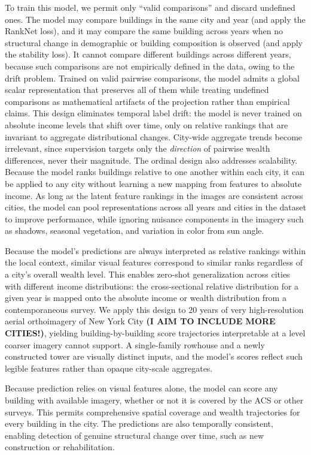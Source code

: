 \documentclass[conference]{IEEEtran}
\begin{document}
To train this model, we permit only ``valid comparisons'' and discard undefined ones. The model may compare buildings in the same city and year (and apply the RankNet loss), and it may compare the same building across years when no structural change in demographic or building composition is observed (and apply the stability loss). It cannot compare different buildings across different years, because such comparisons are not empirically defined in the data, owing to the drift problem. Trained on valid pairwise comparisons, the model admits a global scalar representation that preserves all of them while treating undefined comparisons as mathematical artifacts of the projection rather than empirical claims. This design eliminates temporal label drift: the model is never trained on absolute income levels that shift over time, only on relative rankings that are invariant to aggregate distributional changes. City-wide aggregate trends become irrelevant, since supervision targets only the \emph{direction} of pairwise wealth differences, never their magnitude. The ordinal design also addresses scalability. Because the model ranks buildings relative to one another within each city, it can be applied to any city without learning a new mapping from features to absolute income. As long as the latent feature rankings in the images are consistent across cities, the model can pool representations across all years and cities in the dataset to improve performance, while ignoring nuisance components in the imagery such as shadows, seasonal vegetation, and variation in color from sun angle.

Because the model's predictions are always interpreted as relative rankings within the local context, similar visual features correspond to similar ranks regardless of a city's overall wealth level. This enables zero-shot generalization across cities with different income distributions: the cross-sectional relative distribution for a given year is mapped onto the absolute income or wealth distribution from a contemporaneous survey. We apply this design to 20 years of very high-resolution aerial orthoimagery of New York City \textbf{(I AIM TO INCLUDE MORE CITIES!)}, yielding building-by-building score trajectories interpretable at a level coarser imagery cannot support. A single-family rowhouse and a newly constructed tower are visually distinct inputs, and the model's scores reflect such legible features rather than opaque city-scale aggregates.

Because prediction relies on visual features alone, the model can score any building with available imagery, whether or not it is covered by the ACS or other surveys. This permits comprehensive spatial coverage and wealth trajectories for every building in the city. The predictions are also temporally consistent, enabling detection of genuine structural change over time, such as new construction or rehabilitation.
\end{document}

